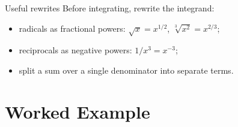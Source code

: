 \begin{rulebox}{Useful rewrites}
Before integrating, rewrite the integrand:
\begin{itemize}[leftmargin=1.6em,itemsep=0.3ex]
  \item radicals as fractional powers: $\sqrt{x}=x^{1/2}$,
        $\sqrt[3]{x^{2}}=x^{2/3}$;
  \item reciprocals as negative powers: $1/x^{3}=x^{-3}$;
  \item split a sum over a single denominator into separate terms.
\end{itemize}
\end{rulebox}

\section{Worked Example}

